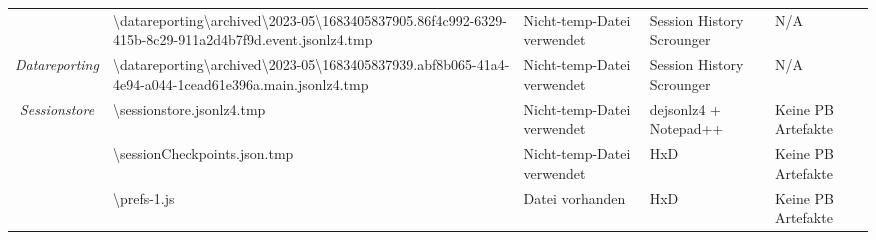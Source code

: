 \begin{appendices}
{\begin{landscape}
\begin{table}[h!]
{\begin{tabular}{cllll}
	\multicolumn{1}{|c|}{}                                                                                       & \multicolumn{1}{l|}{\cellcolor[HTML]{3190FF}\textbackslash{}datareporting\textbackslash{}archived\textbackslash{}2023-05\textbackslash{}1683405837905.86f4c992-6329-415b-8c29-911a2d4b7f9d.event.jsonlz4.tmp}       & \multicolumn{1}{l|}{\cellcolor[HTML]{FCFF2F}Nicht-temp-Datei verwendet}                           & \multicolumn{1}{l|}{Session History Scrounger}   & \multicolumn{1}{l|}{\cellcolor[HTML]{C0C0C0}N/A}                \\ \cline{2-5} 
	\multicolumn{1}{|c|}{\multirow{-4}{*}{\textit{Datareporting}}}                                               & \multicolumn{1}{l|}{\cellcolor[HTML]{3190FF}\textbackslash{}datareporting\textbackslash{}archived\textbackslash{}2023-05\textbackslash{}1683405837939.abf8b065-41a4-4e94-a044-1cead61e396a.main.jsonlz4.tmp}        & \multicolumn{1}{l|}{\cellcolor[HTML]{FCFF2F}Nicht-temp-Datei verwendet}                           & \multicolumn{1}{l|}{Session History Scrounger}   & \multicolumn{1}{l|}{\cellcolor[HTML]{C0C0C0}N/A}                \\ \hline
	\multicolumn{1}{|c|}{\textit{Sessionstore}}                                                                  & \multicolumn{1}{l|}{\cellcolor[HTML]{3190FF}\textbackslash{}sessionstore.jsonlz4.tmp}                                                                                                                               & \multicolumn{1}{l|}{\cellcolor[HTML]{FCFF2F}Nicht-temp-Datei verwendet}                           & \multicolumn{1}{l|}{dejsonlz4 + Notepad++}       & \multicolumn{1}{l|}{\cellcolor[HTML]{F8A102}Keine PB Artefakte} \\ \hline
	\multicolumn{1}{|c|}{}                                                                                       & \multicolumn{1}{l|}{\cellcolor[HTML]{3190FF}\textbackslash{}sessionCheckpoints.json.tmp}                                                                                                                            & \multicolumn{1}{l|}{\cellcolor[HTML]{FCFF2F}Nicht-temp-Datei verwendet}                           & \multicolumn{1}{l|}{HxD}                         & \multicolumn{1}{l|}{\cellcolor[HTML]{F8A102}Keine PB Artefakte} \\ \cline{2-5} 
	\multicolumn{1}{|c|}{}                                                                                       & \multicolumn{1}{l|}{\cellcolor[HTML]{3190FF}\textbackslash{}prefs-1.js}                                                                                                                                             & \multicolumn{1}{l|}{\cellcolor[HTML]{009901}Datei vorhanden}                                      & \multicolumn{1}{l|}{HxD}                         & \multicolumn{1}{l|}{\cellcolor[HTML]{F8A102}Keine PB Artefakte} \\ \cline{2-5} 

\end{tabular}}
\end{table}
\end{landscape}}
\end{appendices}
